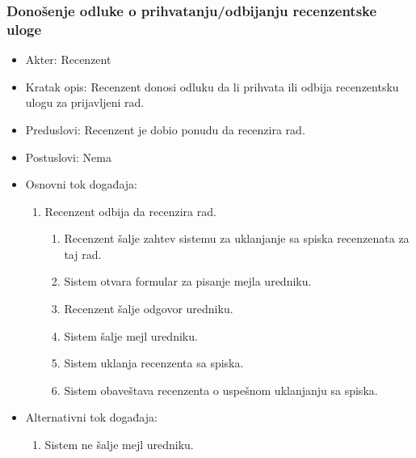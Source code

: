 \documentclass[a4paper]{article}
\begin{document}
\subsubsection{Donošenje odluke o prihvatanju/odbijanju recenzentske uloge}
\label{subsubsection:prihvatanjeodbijanjeuloge}
\begin{itemize}
    \item Akter: Recenzent
    \item Kratak opis: Recenzent donosi odluku da li prihvata ili odbija recenzentsku ulogu za prijavljeni rad.
    \item Preduslovi: Recenzent je dobio ponudu da recenzira rad.
    \item Postuslovi: Nema
    \item Osnovni tok događaja:
        \begin{enumerate}
            \item Recenzent odbija da recenzira rad.
                \begin{enumerate}
                    \item Recenzent šalje zahtev sistemu za uklanjanje sa spiska recenzenata za taj rad.
                    \item Sistem otvara formular za pisanje mejla uredniku.
                    \item Recenzent šalje odgovor uredniku.
                    \item Sistem šalje mejl uredniku.
                    \item Sistem uklanja recenzenta sa spiska.
                    \item Sistem obaveštava recenzenta o uspešnom uklanjanju sa spiska.
                \end{enumerate}
        \end{enumerate}
    \item Alternativni tok događaja:
        \begin{enumerate}
            \item Sistem ne šalje mejl uredniku.
            \begin{enumerate}

\end{enumerate}
\end{enumerate}
\end{itemize}
\end{document}
